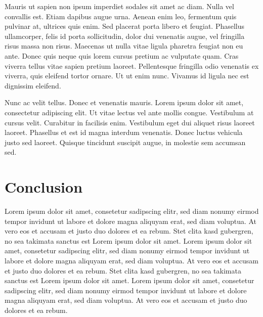\documentclass[journal]{vgtc}                %
\begin{document}
Mauris ut sapien non ipsum imperdiet sodales sit amet ac diam. Nulla vel convallis est. Etiam dapibus augue urna. Aenean enim leo, fermentum quis pulvinar at, ultrices quis enim. Sed placerat porta libero et feugiat. Phasellus ullamcorper, felis id porta sollicitudin, dolor dui venenatis augue, vel fringilla risus massa non risus. Maecenas ut nulla vitae ligula pharetra feugiat non eu ante. Donec quis neque quis lorem cursus pretium ac vulputate quam. Cras viverra tellus vitae sapien pretium laoreet. Pellentesque fringilla odio venenatis ex viverra, quis eleifend tortor ornare. Ut ut enim nunc. Vivamus id ligula nec est dignissim eleifend.

Nunc ac velit tellus. Donec et venenatis mauris. Lorem ipsum dolor sit amet, consectetur adipiscing elit. Ut vitae lectus vel ante mollis congue. Vestibulum at cursus velit. Curabitur in facilisis enim. Vestibulum eget dui aliquet risus laoreet laoreet. Phasellus et est id magna interdum venenatis. Donec luctus vehicula justo sed laoreet. Quisque tincidunt suscipit augue, in molestie sem accumsan sed.
\section{Conclusion}

Lorem ipsum dolor sit amet, consetetur sadipscing elitr, sed diam
nonumy eirmod tempor invidunt ut labore et dolore magna aliquyam erat,
sed diam voluptua. At vero eos et accusam et justo duo dolores et ea
rebum. Stet clita kasd gubergren, no sea takimata sanctus est Lorem
ipsum dolor sit amet. Lorem ipsum dolor sit amet, consetetur
sadipscing elitr, sed diam nonumy eirmod tempor invidunt ut labore et
dolore magna aliquyam erat, sed diam voluptua. At vero eos et accusam
et justo duo dolores et ea rebum. Stet clita kasd gubergren, no sea
takimata sanctus est Lorem ipsum dolor sit amet. Lorem ipsum dolor sit
amet, consetetur sadipscing elitr, sed diam nonumy eirmod tempor
invidunt ut labore et dolore magna aliquyam erat, sed diam
voluptua. At vero eos et accusam et justo duo dolores et ea
rebum.



%

%
%
%


\end{document}

